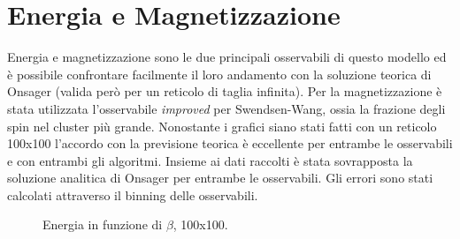 \section{Energia e Magnetizzazione}
Energia e magnetizzazione sono le due principali osservabili di questo modello ed è possibile confrontare facilmente il loro andamento con la soluzione teorica di Onsager (valida però per un reticolo di taglia infinita).
Per la magnetizzazione è stata utilizzata l'osservabile \emph{improved} per Swendsen-Wang, ossia la frazione degli spin nel cluster più grande.
Nonostante i grafici siano stati fatti con un reticolo 100x100 l'accordo con la previsione teorica è eccellente per entrambe le osservabili e con entrambi gli algoritmi.
Insieme ai dati raccolti è stata sovrapposta la soluzione analitica di Onsager per entrambe le osservabili.
Gli errori sono stati calcolati attraverso il binning delle osservabili.
\begin{figure}[h]
\caption{Energia in funzione di $\beta$, 100x100.}
\end{figure}
